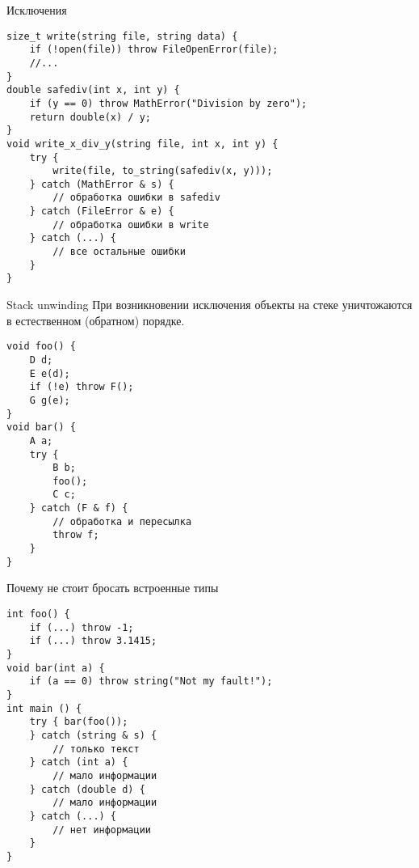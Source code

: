 \documentclass[aspectration=1610,t]{beamer}
\begin{document}
\begin{frame}[fragile]{Исключения}






\begin{lstlisting}
size_t write(string file, string data) {
    if (!open(file)) throw FileOpenError(file);
    //...
}
double safediv(int x, int y) {
    if (y == 0) throw MathError("Division by zero");
    return double(x) / y;
}
void write_x_div_y(string file, int x, int y) {
    try { 
        write(file, to_string(safediv(x, y)));
    } catch (MathError & s) { 
        // обработка ошибки в safediv
    } catch (FileError & e) { 
        // обработка ошибки в write
    } catch (...) { 
        // все остальные ошибки
    }
}
\end{lstlisting}
\end{frame}

\begin{frame}[fragile]{Stack unwinding}
При возникновении исключения объекты на стеке
уничтожаются\\ в естественном (обратном) порядке.
\begin{lstlisting}
void foo() {
    D d;
    E e(d);
    if (!e) throw F();
    G g(e);
}
void bar() {
    A a;
    try {
        B b;
        foo();
        C c;
    } catch (F & f) {
        // обработка и пересылка
        throw f;
    }
}
\end{lstlisting}
\end{frame}

\begin{frame}[fragile]{Почему не стоит бросать встроенные типы}
\begin{lstlisting}
int foo() {
    if (...) throw -1;
    if (...) throw 3.1415;
}
void bar(int a) {
    if (a == 0) throw string("Not my fault!");
}
int main () {
    try { bar(foo());
    } catch (string & s) {
        // только текст
    } catch (int a) { 
        // мало информации
    } catch (double d) { 
        // мало информации
    } catch (...) { 
        // нет информации 
    }
}
\end{lstlisting}
\end{frame}
\end{document}
